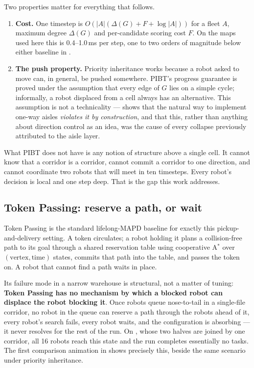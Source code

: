 Two properties matter for everything that follows.

\begin{enumerate}
\item \textbf{Cost.} One timestep is $O(|A|(\Delta(G) + F + \log|A|))$ for a
fleet $A$, maximum degree $\Delta(G)$ and per-candidate scoring cost $F$. On
the maps used here this is 0.4--1.0\,ms per step, one to two orders of
magnitude below either baseline in .

\item \textbf{The push property.} Priority inheritance works because a robot
asked to move can, in general, be pushed somewhere. PIBT's progress guarantee
is proved under the assumption that every edge of $G$ lies on a simple cycle;
informally, a robot displaced from a cell always has an alternative. This
assumption is not a technicality ---  shows that
the natural way to implement one-way aisles \emph{violates it by construction},
and that this, rather than anything about direction control as an idea, was the
cause of every collapse previously attributed to the aisle layer.
\end{enumerate}

What PIBT does not have is any notion of structure above a single cell. It
cannot know that a corridor is a corridor, cannot commit a corridor to one
direction, and cannot coordinate two robots that will meet in ten timesteps.
Every robot's decision is local and one step deep. That is the gap this work
addresses.

\subsection{Token Passing: reserve a path, or wait}
\label{sec:related-tp}

Token Passing \citep{ma2017tp} is the standard lifelong-MAPD baseline for
exactly this pickup-and-delivery setting. A token circulates; a robot holding
it plans a collision-free path to its goal through a shared reservation table
using cooperative A$^\ast$ over $(\text{vertex}, \text{time})$ states, commits
that path into the table, and passes the token on. A robot that cannot find a
path waits in place.

Its failure mode in a narrow warehouse is structural, not a matter of tuning:
\textbf{Token Passing has no mechanism by which a blocked robot can displace
the robot blocking it}. Once robots queue nose-to-tail in a single-file
corridor, no robot in the queue can reserve a path through the robots ahead of
it, every robot's search fails, every robot waits, and the configuration is
absorbing --- it never resolves for the rest of the run. On
, whose two halves are joined by one corridor,
all 16 robots reach this state and the run completes essentially no tasks. The
first comparison animation in  shows precisely this, beside
the same scenario under priority inheritance.

